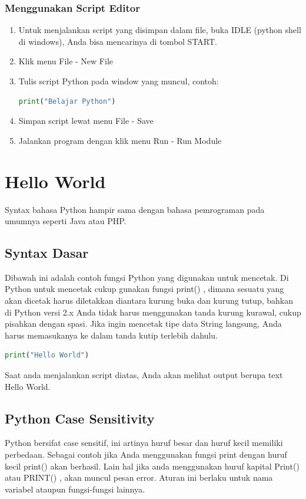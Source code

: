 \subsubsection{Menggunakan Script Editor}
\begin{enumerate}
\item Untuk menjalankan script yang disimpan dalam file, buka IDLE (python shell di windows), Anda bisa mencarinya di tombol START.
\item Klik menu File - New File
\item Tulis script Python pada window yang muncul, contoh:
\begin{lstlisting}[language=Python]
print("Belajar Python")
\end{lstlisting}
\item Simpan script lewat menu File - Save
\item Jalankan program dengan klik menu Run - Run Module
\end{enumerate}

\section{Hello World}
Syntax bahasa Python hampir sama dengan bahasa pemrograman pada umumnya seperti Java atau PHP.

\subsection{Syntax Dasar}
Dibawah ini adalah contoh fungsi Python yang digunakan untuk mencetak. Di Python untuk mencetak cukup gunakan fungsi print() , dimana sesuatu yang akan dicetak harus diletakkan diantara kurung buka dan kurung tutup, bahkan di Python versi 2.x Anda tidak harus menggunakan tanda kurung kurawal, cukup pisahkan dengan spasi. Jika ingin mencetak tipe data String langsung, Anda harus memasukanya ke dalam tanda kutip terlebih dahulu.
\begin{lstlisting}[language=Python]
print("Hello World")
\end{lstlisting}
Saat anda menjalankan script diatas, Anda akan melihat output berupa text Hello World.

\subsection{Python Case Sensitivity}
Python bersifat case sensitif, ini artinya huruf besar dan huruf kecil memiliki perbedaan. Sebagai contoh jika Anda menggunakan fungsi print dengan huruf kecil print() akan berhasil. Lain hal jika anda menggunakan huruf kapital Print() atau PRINT() , akan muncul pesan error. Aturan ini berlaku untuk nama variabel ataupun fungsi-fungsi lainnya.

